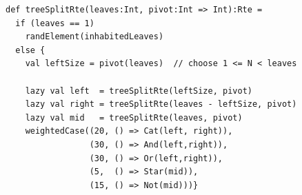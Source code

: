 \begin{lstlisting}[style=scalaioScala]
def treeSplitRte(leaves:Int, pivot:Int => Int):Rte =
  if (leaves == 1)
    randElement(inhabitedLeaves)
  else {
    val leftSize = pivot(leaves)  // choose 1 <= N < leaves

    lazy val left  = treeSplitRte(leftSize, pivot)
    lazy val right = treeSplitRte(leaves - leftSize, pivot)
    lazy val mid   = treeSplitRte(leaves, pivot)
    weightedCase((20, () => Cat(left, right)),
                 (30, () => And(left,right)),
                 (30, () => Or(left,right)),
                 (5,  () => Star(mid)),
                 (15, () => Not(mid)))}
\end{lstlisting}
